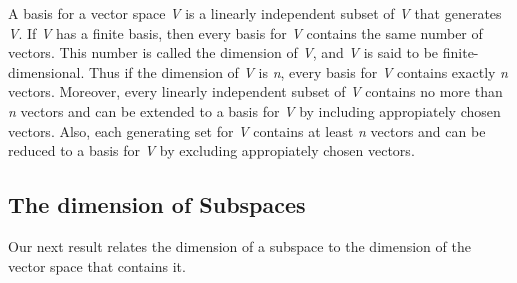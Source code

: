 A basis for a vector space \textit V is a linearly independent subset of \textit V that generates \textit V. If \textit V has a finite basis, then every basis for \textit V contains the same number of vectors. This number is called the  dimension of \textit V, and \textit V is said to be finite-dimensional. Thus if the dimension of \textit V is \textit n, every basis for \textit V contains exactly \textit n vectors. Moreover, every linearly independent subset of \textit V contains no more than \textit n vectors and can be extended to a basis for \textit V by including appropiately chosen vectors. Also, each generating set for \textit V contains at least \textit n vectors and can be reduced to a basis for \textit V by excluding appropiately chosen vectors.
\begin{center}
\end{center}


\subsection{The dimension of Subspaces}

Our next result relates the dimension of a subspace to the dimension of the vector space that contains it.


